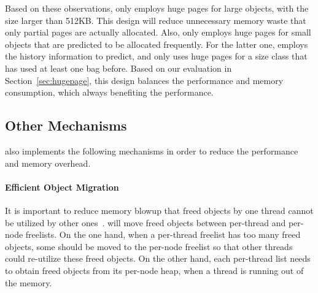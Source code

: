 Based on these observations,  \NM{} only employs huge pages for large objects, with the size larger than 512KB. This design will reduce unnecessary memory waste that only partial pages are actually allocated. Also, \NM{} only employs huge pages for small objects that are predicted to be allocated frequently. For the latter one, \NM{} employs the history information to predict, and only uses huge pages for a size class that has used at least one bag before. Based on our evaluation in Section~\ref{sec:hugepage}, this design balances the performance and memory consumption, which always benefiting the performance. 


\subsection{Other Mechanisms}
\label{sec: others}

\NM{} also implements the following mechanisms in order to reduce the performance and memory overhead. 

\paragraph{Efficient Object Migration} It is important to reduce memory blowup that freed objects by one thread cannot be utilized by other ones~\cite{Hoard}.  \NM{} will move freed objects between per-thread and per-node freelists. On the one hand, when a per-thread freelist has too many freed objects, some should be moved to the per-node freelist so that other threads could re-utilize these freed objects. On the other hand, each per-thread list needs to obtain freed objects from its per-node heap, when a thread is running out of the memory. 

